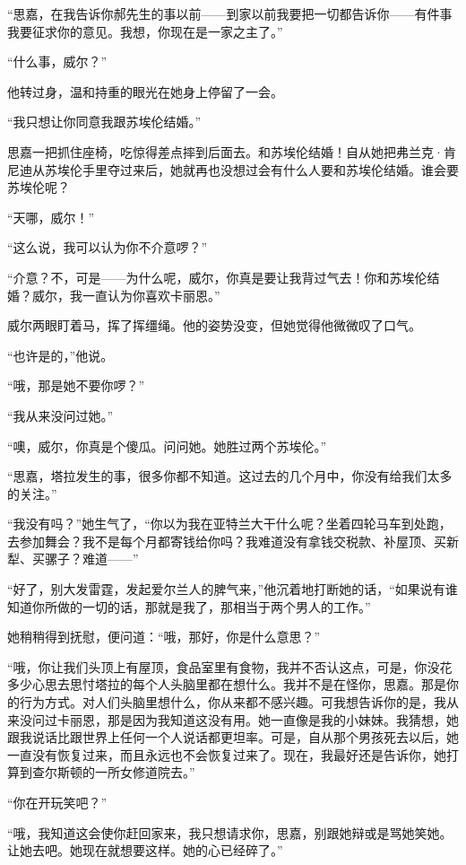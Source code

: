 \par “思嘉，在我告诉你郝先生的事以前——到家以前我要把一切都告诉你——有件事我要征求你的意见。我想，你现在是一家之主了。”
\par “什么事，威尔？”
\par 他转过身，温和持重的眼光在她身上停留了一会。
\par “我只想让你同意我跟苏埃伦结婚。”
\par 思嘉一把抓住座椅，吃惊得差点摔到后面去。和苏埃伦结婚！自从她把弗兰克·肯尼迪从苏埃伦手里夺过来后，她就再也没想过会有什么人要和苏埃伦结婚。谁会要苏埃伦呢？
\par “天哪，威尔！”
\par “这么说，我可以认为你不介意啰？”
\par “介意？不，可是——为什么呢，威尔，你真是要让我背过气去！你和苏埃伦结婚？威尔，我一直认为你喜欢卡丽恩。”
\par 威尔两眼盯着马，挥了挥缰绳。他的姿势没变，但她觉得他微微叹了口气。
\par “也许是的，”他说。
\par “哦，那是她不要你啰？”
\par “我从来没问过她。”
\par “噢，威尔，你真是个傻瓜。问问她。她胜过两个苏埃伦。”
\par “思嘉，塔拉发生的事，很多你都不知道。这过去的几个月中，你没有给我们太多的关注。”
\par “我没有吗？”她生气了，“你以为我在亚特兰大干什么呢？坐着四轮马车到处跑，去参加舞会？我不是每个月都寄钱给你吗？我难道没有拿钱交税款、补屋顶、买新犁、买骡子？难道——”
\par “好了，别大发雷霆，发起爱尔兰人的脾气来，”他沉着地打断她的话，“如果说有谁知道你所做的一切的话，那就是我了，那相当于两个男人的工作。”
\par 她稍稍得到抚慰，便问道：“哦，那好，你是什么意思？”
\par “哦，你让我们头顶上有屋顶，食品室里有食物，我并不否认这点，可是，你没花多少心思去思忖塔拉的每个人头脑里都在想什么。我并不是在怪你，思嘉。那是你的行为方式。对人们头脑里想什么，你从来都不感兴趣。可我想告诉你的是，我从来没问过卡丽恩，那是因为我知道这没有用。她一直像是我的小妹妹。我猜想，她跟我说话比跟世界上任何一个人说话都更坦率。可是，自从那个男孩死去以后，她一直没有恢复过来，而且永远也不会恢复过来了。现在，我最好还是告诉你，她打算到查尔斯顿的一所女修道院去。”
\par “你在开玩笑吧？”
\par “哦，我知道这会使你赶回家来，我只想请求你，思嘉，别跟她辩或是骂她笑她。让她去吧。她现在就想要这样。她的心已经碎了。”

